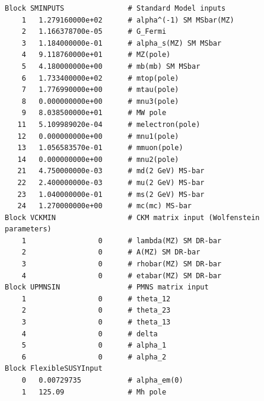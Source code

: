 \documentclass[final,3p,11pt,pdflatex]{elsarticle}
\begin{document}
\begin{lstlisting}
Block SMINPUTS               # Standard Model inputs
    1   1.279160000e+02      # alpha^(-1) SM MSbar(MZ)
    2   1.166378700e-05      # G_Fermi
    3   1.184000000e-01      # alpha_s(MZ) SM MSbar
    4   9.118760000e+01      # MZ(pole)
    5   4.180000000e+00      # mb(mb) SM MSbar
    6   1.733400000e+02      # mtop(pole)
    7   1.776990000e+00      # mtau(pole)
    8   0.000000000e+00      # mnu3(pole)
    9   8.038500000e+01      # MW pole
   11   5.109989020e-04      # melectron(pole)
   12   0.000000000e+00      # mnu1(pole)
   13   1.056583570e-01      # mmuon(pole)
   14   0.000000000e+00      # mnu2(pole)
   21   4.750000000e-03      # md(2 GeV) MS-bar
   22   2.400000000e-03      # mu(2 GeV) MS-bar
   23   1.040000000e-01      # ms(2 GeV) MS-bar
   24   1.270000000e+00      # mc(mc) MS-bar
Block VCKMIN                 # CKM matrix input (Wolfenstein parameters)
    1                 0      # lambda(MZ) SM DR-bar
    2                 0      # A(MZ) SM DR-bar
    3                 0      # rhobar(MZ) SM DR-bar
    4                 0      # etabar(MZ) SM DR-bar
Block UPMNSIN                # PMNS matrix input
    1                 0      # theta_12
    2                 0      # theta_23
    3                 0      # theta_13
    4                 0      # delta
    5                 0      # alpha_1
    6                 0      # alpha_2
Block FlexibleSUSYInput
    0   0.00729735           # alpha_em(0)
    1   125.09               # Mh pole
\end{lstlisting}
\end{document}
